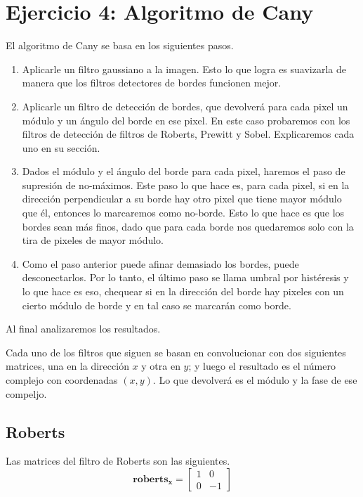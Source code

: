 \documentclass[11pt, spanish]{article}
\begin{document}
\newpage
\section{Ejercicio 4: Algoritmo de Cany}

El algoritmo de Cany se basa en los siguientes pasos.

\begin{enumerate}
\item Aplicarle un filtro gaussiano a la imagen. Esto lo que logra es suavizarla de manera que los filtros detectores de bordes funcionen mejor.
\item Aplicarle un filtro de detección de bordes, que devolverá para cada pixel un módulo y un ángulo del borde en ese pixel. En este caso probaremos con los filtros de detección de filtros de Roberts, Prewitt y Sobel. Explicaremos cada uno en su sección.
\item Dados el módulo y el ángulo del borde para cada pixel, haremos el paso de supresión de no-máximos. Este paso lo que hace es, para cada pixel, si en la dirección perpendicular a su borde hay otro pixel que tiene mayor módulo que él, entonces lo marcaremos como no-borde.
Esto lo que hace es que los bordes sean más finos, dado que para cada borde nos quedaremos solo con la tira de pixeles de mayor módulo.
\item Como el paso anterior puede afinar demasiado los bordes, puede desconectarlos. Por lo tanto, el último paso se llama umbral por histéresis y lo que hace es eso, chequear si en la dirección del borde hay pixeles con un cierto módulo de borde y en tal caso se marcarán como borde.
\end{enumerate}

Al final analizaremos los resultados.

Cada uno de los filtros que siguen se basan en convolucionar con dos siguientes matrices, una en la dirección $x$ y otra en $y$; y luego el resultado es el número complejo con coordenadas $(x,y)$. Lo que devolverá es el módulo y la fase de ese compeljo.



\subsection{Roberts}
Las matrices del filtro de Roberts son las siguientes.
\[
\mathbf{roberts_x} = \begin{bmatrix} 
1 & 0 \\
0 & -1
\end{bmatrix}
\]
\end{document}
